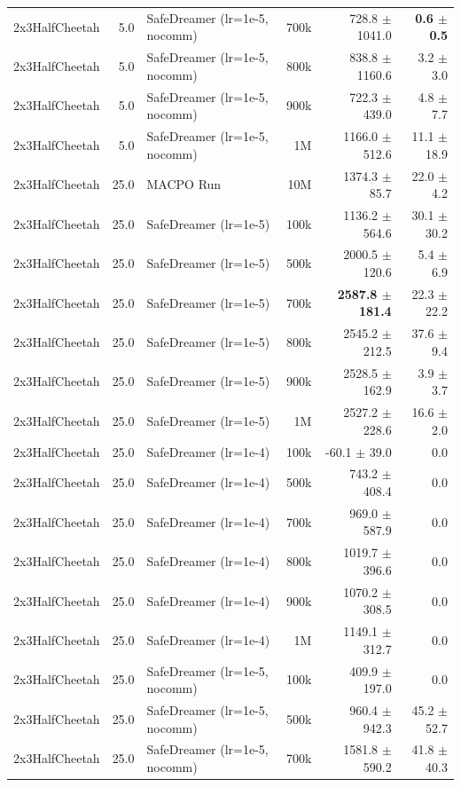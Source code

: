 \documentclass{article}
\begin{document}
\begin{longtable}{l r l r r r}
2x3HalfCheetah & 5.0 & SafeDreamer (lr=1e-5, nocomm) & 700k & 728.8 $\pm$ 1041.0 & \textbf{0.6 $\pm$ 0.5} \\
2x3HalfCheetah & 5.0 & SafeDreamer (lr=1e-5, nocomm) & 800k & 838.8 $\pm$ 1160.6 & 3.2 $\pm$ 3.0 \\
2x3HalfCheetah & 5.0 & SafeDreamer (lr=1e-5, nocomm) & 900k & 722.3 $\pm$ 439.0 & 4.8 $\pm$ 7.7 \\
2x3HalfCheetah & 5.0 & SafeDreamer (lr=1e-5, nocomm) & 1M & 1166.0 $\pm$ 512.6 & 11.1 $\pm$ 18.9 \\
\midrule
2x3HalfCheetah & 25.0 & MACPO Run & 10M & 1374.3 $\pm$ 85.7 & 22.0 $\pm$ 4.2 \\
2x3HalfCheetah & 25.0 & SafeDreamer (lr=1e-5) & 100k & 1136.2 $\pm$ 564.6 & 30.1 $\pm$ 30.2 \\
2x3HalfCheetah & 25.0 & SafeDreamer (lr=1e-5) & 500k & 2000.5 $\pm$ 120.6 & 5.4 $\pm$ 6.9 \\
2x3HalfCheetah & 25.0 & SafeDreamer (lr=1e-5) & 700k & \textbf{2587.8 $\pm$ 181.4} & 22.3 $\pm$ 22.2 \\
2x3HalfCheetah & 25.0 & SafeDreamer (lr=1e-5) & 800k & 2545.2 $\pm$ 212.5 & 37.6 $\pm$ 9.4 \\
2x3HalfCheetah & 25.0 & SafeDreamer (lr=1e-5) & 900k & 2528.5 $\pm$ 162.9 & 3.9 $\pm$ 3.7 \\
2x3HalfCheetah & 25.0 & SafeDreamer (lr=1e-5) & 1M & 2527.2 $\pm$ 228.6 & 16.6 $\pm$ 2.0 \\
2x3HalfCheetah & 25.0 & SafeDreamer (lr=1e-4) & 100k & -60.1 $\pm$ 39.0 & 0.0 \\
2x3HalfCheetah & 25.0 & SafeDreamer (lr=1e-4) & 500k & 743.2 $\pm$ 408.4 & 0.0 \\
2x3HalfCheetah & 25.0 & SafeDreamer (lr=1e-4) & 700k & 969.0 $\pm$ 587.9 & 0.0 \\
2x3HalfCheetah & 25.0 & SafeDreamer (lr=1e-4) & 800k & 1019.7 $\pm$ 396.6 & 0.0 \\
2x3HalfCheetah & 25.0 & SafeDreamer (lr=1e-4) & 900k & 1070.2 $\pm$ 308.5 & 0.0 \\
2x3HalfCheetah & 25.0 & SafeDreamer (lr=1e-4) & 1M & 1149.1 $\pm$ 312.7 & 0.0 \\
2x3HalfCheetah & 25.0 & SafeDreamer (lr=1e-5, nocomm) & 100k & 409.9 $\pm$ 197.0 & 0.0 \\
2x3HalfCheetah & 25.0 & SafeDreamer (lr=1e-5, nocomm) & 500k & 960.4 $\pm$ 942.3 & 45.2 $\pm$ 52.7 \\
2x3HalfCheetah & 25.0 & SafeDreamer (lr=1e-5, nocomm) & 700k & 1581.8 $\pm$ 590.2 & 41.8 $\pm$ 40.3 \\

\end{longtable}
\end{document}
